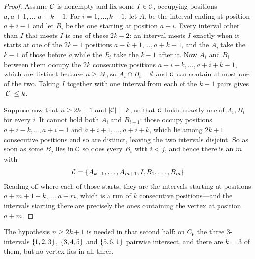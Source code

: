 \begin{proof}
    Assume $\mathcal{C}$ is nonempty and fix some $I \in \mathcal{C}$, occupying positions $a, a + 1, \ldots, a + k - 1$. For $i = 1, \ldots, k - 1$, let $A_i$ be the interval ending at position $a + i - 1$ and let $B_i$ be the one starting at position $a + i$. Every interval other than $I$ that meets $I$ is one of these $2k - 2$: an interval meets $I$ exactly when it starts at one of the $2k - 1$ positions $a - k + 1, \ldots, a + k - 1$, and the $A_i$ take the $k - 1$ of those before $a$ while the $B_i$ take the $k - 1$ after it. Now $A_i$ and $B_i$ between them occupy the $2k$ consecutive positions $a + i - k, \ldots, a + i + k - 1$, which are distinct because $n \geq 2k$, so $A_i \cap B_i = \emptyset$ and $\mathcal{C}$ can contain at most one of the two. Taking $I$ together with one interval from each of the $k - 1$ pairs gives $\left\lvert \mathcal{C} \right\rvert \leq k$.

    Suppose now that $n \geq 2k + 1$ and $\left\lvert \mathcal{C} \right\rvert = k$, so that $\mathcal{C}$ holds exactly one of $A_i, B_i$ for every $i$. It cannot hold both $A_i$ and $B_{i+1}$: those occupy positions $a + i - k, \ldots, a + i - 1$ and $a + i + 1, \ldots, a + i + k$, which lie among $2k + 1$ consecutive positions and so are distinct, leaving the two intervals disjoint. So as soon as some $B_j$ lies in $\mathcal{C}$ so does every $B_i$ with $i < j$, and hence there is an $m$ with
    \begin{align*}
        \mathcal{C} = \left\{ A_{k-1}, \ldots, A_{m+1}, I, B_1, \ldots, B_m \right\}
    \end{align*}
    Reading off where each of those starts, they are the intervals starting at positions $a + m + 1 - k, \ldots, a + m$, which is a run of $k$ consecutive positions---and the intervals starting there are precisely the ones containing the vertex at position $a + m$.
\end{proof}

The hypothesis $n \geq 2k + 1$ is needed in that second half: on $C_6$ the three $3$-intervals $\left\{ 1, 2, 3 \right\}$, $\left\{ 3, 4, 5 \right\}$ and $\left\{ 5, 6, 1 \right\}$ pairwise intersect, and there are $k = 3$ of them, but no vertex lies in all three.

